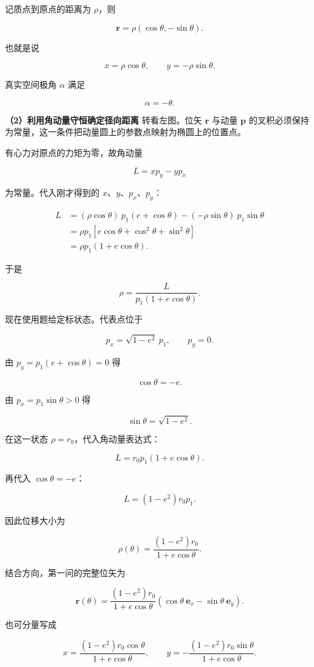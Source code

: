 \documentclass[12pt,a4paper,UTF8]{ctexart}
\begin{document}
记质点到原点的距离为 \(\rho\)，则

\[\boxed{\bm r=\rho(\cos\theta,-\sin\theta)}.\]

也就是说

\[x=\rho\cos\theta,\qquad y=-\rho\sin\theta.\]

真实空间极角 \(\alpha\) 满足

\[\boxed{\alpha=-\theta}.\]

\textbf{（2）利用角动量守恒确定径向距离} 转看左图。位矢 \(\bm r\) 与动量
\(\bm p\)
的叉积必须保持为常量，这一条件把动量圆上的参数点映射为椭圆上的位置点。

有心力对原点的力矩为零，故角动量

\[L=xp_y-yp_x\]

为常量。代入刚才得到的 \(x\)、\(y\)、\(p_x\)、\(p_y\)：

\[\begin{aligned}
L
&=(\rho\cos\theta)\ p_1(e+\cos\theta)
-(-\rho\sin\theta)\ p_1\sin\theta\\
&=\rho p_1\left[e\cos\theta+\cos^2\theta+\sin^2\theta\right]\\
&=\rho p_1(1+e\cos\theta).
\end{aligned}\]

于是

\[\rho=\frac{L}{p_1(1+e\cos\theta)}.\]

现在使用题给定标状态。代表点位于

\[p_x=\sqrt{1-e^2}\ p_1,\qquad p_y=0.\]

由 \(p_y=p_1(e+\cos\theta)=0\) 得

\[\cos\theta=-e.\]

由 \(p_x=p_1\sin\theta>0\) 得

\[\sin\theta=\sqrt{1-e^2}.\]

在这一状态 \(\rho=r_0\)，代入角动量表达式：

\[L=r_0p_1(1+e\cos\theta).\]

再代入 \(\cos\theta=-e\)：

\[\boxed{L=(1-e^2)r_0p_1}.\]

因此位移大小为

\[\boxed{\rho(\theta)=\frac{(1-e^2)r_0}{1+e\cos\theta}}.\]

结合方向，第一问的完整位矢为

\[\boxed{
\bm r(\theta)=
\frac{(1-e^2)r_0}{1+e\cos\theta}
\left(\cos\theta\ \bm e_x-\sin\theta\ \bm e_y\right)
}.\]

也可分量写成

\[\boxed{
x=\frac{(1-e^2)r_0\cos\theta}{1+e\cos\theta},
\qquad
y=-\frac{(1-e^2)r_0\sin\theta}{1+e\cos\theta}
}.\]
\end{document}
